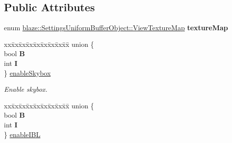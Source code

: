 \subsection*{Public Attributes}
\begin{DoxyCompactItemize}
\item 
\mbox{\label{structblaze_1_1SettingsUniformBufferObject_a97e085a881b43ef80a6e473e657a663f}} 
enum \hyperlink{structblaze_1_1SettingsUniformBufferObject_a713e01d20c85cc832626133616f90843}{blaze\+::\+Settings\+Uniform\+Buffer\+Object\+::\+View\+Texture\+Map} {\bfseries texture\+Map}
\item 
\mbox{\label{structblaze_1_1SettingsUniformBufferObject_ae29ac9ab3e6182750722bdc894656b72}} 
\begin{tabbing}
xx\=xx\=xx\=xx\=xx\=xx\=xx\=xx\=xx\=\kill
union \{\\
\>bool {\bfseries B}\\
\>int {\bfseries I}\\
\} \hyperlink{structblaze_1_1SettingsUniformBufferObject_ae29ac9ab3e6182750722bdc894656b72}{enableSkybox}\\

\end{tabbing}\begin{DoxyCompactList}\small\item\em Enable skybox. \end{DoxyCompactList}\item 
\mbox{\label{structblaze_1_1SettingsUniformBufferObject_abc49fdbfeaeb0fb78e9f957c42c4935a}} 
\begin{tabbing}
xx\=xx\=xx\=xx\=xx\=xx\=xx\=xx\=xx\=\kill
union \{\\
\>bool {\bfseries B}\\
\>int {\bfseries I}\\
\} \hyperlink{structblaze_1_1SettingsUniformBufferObject_abc49fdbfeaeb0fb78e9f957c42c4935a}{enableIBL}\\


\end{tabbing}
\end{DoxyCompactItemize}
